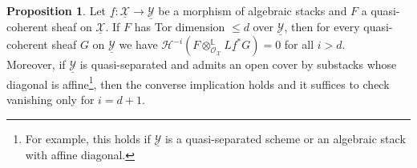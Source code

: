\documentclass[11pt]{amsart}
\theoremstyle{definition}
\theoremstyle{definition}
\newtheorem{proposition}[theorem]{Proposition}
\newcommand{\cY}{\mathcal{Y}}
\newcommand{\ul}[1]{\underline{#1}}
\newcommand{\cal}{\mathcal}
\def\cY{{\cal Y}}
\begin{document}
\begin{proposition}\label{prop: stacky Tor dimension in terms of qcoh sheaves}
    Let $\underline{f}\colon \underline{\mathcal{X}}\rightarrow \underline{\mathcal{Y}}$ be a morphism of algebraic stacks and $F$ a quasi-coherent sheaf on $\underline{\mathcal{X}}$. If $F$ has Tor dimension $\leq d$ over $\underline{\mathcal{Y}}$, then for every quasi-coherent sheaf $G$ on $\underline{\mathcal{Y}}$ we have $\mathcal{H}^{-i}(F\otimes_{\mathcal{O}_{\underline{\mathcal{X}}}}^\mathbb{L} L\underline{f}^*G) = 0$ for all $i>d$. \\
    Moreover, if $\underline{\mathcal{Y}}$ is quasi-separated and admits an open cover by substacks whose diagonal is affine\footnote{For example, this holds if $\ul{\cY}$ is a quasi-separated scheme or an algebraic stack with affine diagonal.}, then the converse implication holds and it suffices to check vanishing only for $i=d+1$.
\end{proposition}
\end{document}
